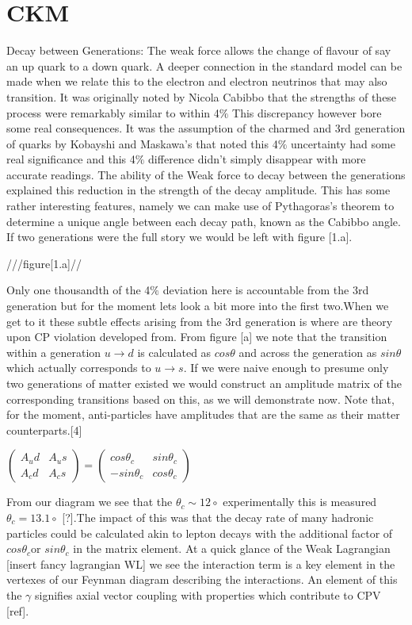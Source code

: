 \documentclass[11pt,onecolumn]{article}
\begin{document}
\section*{CKM}

Decay between Generations:
The weak force allows the change of flavour of say an up quark to a down quark. A deeper connection in the standard model can be made when we relate this to the electron and electron neutrinos that may also transition. It was originally noted by Nicola Cabibbo that the strengths of these process were remarkably similar to within 4$\%$ This discrepancy however bore some real consequences. It was the assumption of the charmed and 3rd generation of quarks by Kobayshi and Maskawa’s that noted this 4$\%$ uncertainty had some real significance and this 4$\%$ difference didn't simply disappear with more accurate readings. The ability of the Weak force to decay between the generations explained this reduction in the strength of the decay amplitude. This has some rather interesting features, namely we can make use of Pythagoras’s theorem to determine a unique angle between each decay path, known as the Cabibbo angle. If two generations were the full story we would be left with figure [1.a].

///figure[1.a]//

Only one thousandth of the 4$\%$ deviation here is accountable from the 3rd generation but for the moment lets look a bit more into the first two.When we get to it these subtle effects arising from the 3rd generation is where are theory upon CP violation developed from. From figure [a] we note that the transition within a generation $u\rightarrow d$ is calculated as $cos\theta$ and across the generation as $sin\theta$ which actually corresponds to $u\rightarrow s$. If we were naive enough to presume only two generations of matter existed we would construct an amplitude matrix of the corresponding transitions based on this, as we will demonstrate now. Note that, for the moment, anti-particles have amplitudes that are the same as their matter counterparts.[4]

$\begin{pmatrix} A_ud & A_us \\ A_cd & A_cs \end{pmatrix} = \begin{pmatrix} cos\theta_c & sin\theta_c \\ -sin\theta_c & cos\theta_c \end{pmatrix}$

From our diagram we see that the $\theta_c\sim 12\circ$ experimentally this is measured $\theta_c = 13.1\circ$ [?].The impact of this was that the decay rate of many hadronic particles could be calculated akin to lepton decays with the additional factor of $cos\theta_c$or $sin\theta_c$ in the matrix element. At a quick glance of the Weak Lagrangian [insert fancy lagrangian WL] we see the interaction term is a key element in the vertexes of our Feynman diagram describing the interactions. An element of this the $\gamma$ signifies axial vector coupling with properties which contribute to CPV [ref].
\end{document}
